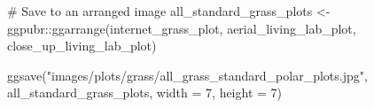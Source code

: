 \documentclass[
  letterpaper,
  DIV=11,
  numbers=noendperiod]{scrreprt}
\newenvironment{Shaded}{\begin{snugshade}}{\end{snugshade}}
\newcommand{\AttributeTok}[1]{\textcolor[rgb]{0.40,0.45,0.13}{#1}}
\newcommand{\CommentTok}[1]{\textcolor[rgb]{0.37,0.37,0.37}{#1}}
\newcommand{\DecValTok}[1]{\textcolor[rgb]{0.68,0.00,0.00}{#1}}
\newcommand{\FunctionTok}[1]{\textcolor[rgb]{0.28,0.35,0.67}{#1}}
\newcommand{\NormalTok}[1]{\textcolor[rgb]{0.00,0.23,0.31}{#1}}
\newcommand{\OtherTok}[1]{\textcolor[rgb]{0.00,0.23,0.31}{#1}}
\newcommand{\SpecialCharTok}[1]{\textcolor[rgb]{0.37,0.37,0.37}{#1}}
\newcommand{\StringTok}[1]{\textcolor[rgb]{0.13,0.47,0.30}{#1}}
\begin{document}
\begin{Shaded}
\begin{Highlighting}[]
\CommentTok{\# Save to an arranged image}
\NormalTok{all\_standard\_grass\_plots }\OtherTok{\textless{}{-}}\NormalTok{ ggpubr}\SpecialCharTok{::}\FunctionTok{ggarrange}\NormalTok{(internet\_grass\_plot, }
\NormalTok{                                             aerial\_living\_lab\_plot, }
\NormalTok{                                             close\_up\_living\_lab\_plot)}

\FunctionTok{ggsave}\NormalTok{(}\StringTok{"images/plots/grass/all\_grass\_standard\_polar\_plots.jpg"}\NormalTok{, }
\NormalTok{       all\_standard\_grass\_plots, }
       \AttributeTok{width =} \DecValTok{7}\NormalTok{, }
       \AttributeTok{height =} \DecValTok{7}\NormalTok{)}
\end{Highlighting}
\end{Shaded}
\end{document}
